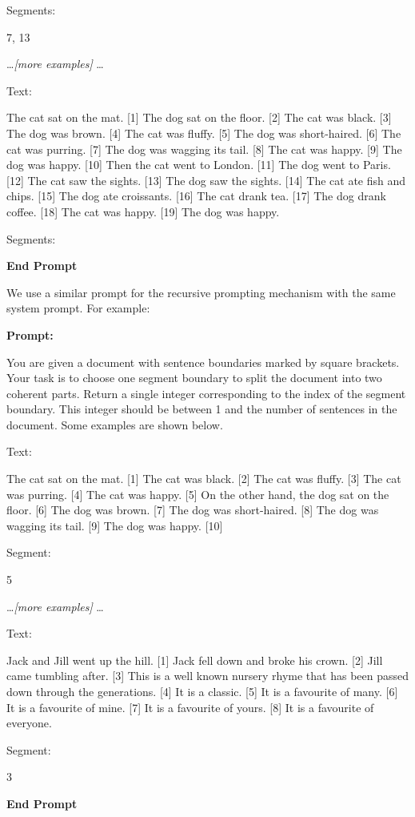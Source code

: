 Segments: 

7, 13

\ldots \emph{[more examples]} \ldots

Text: 

The cat sat on the mat. [1] The dog sat on the floor. [2] The cat was black. [3] The dog was brown. [4] The cat was fluffy. [5] The dog was short-haired. [6] The cat was purring. [7] The dog was wagging its tail. [8] The cat was happy. [9] The dog was happy. [10] Then the cat went to London. [11] The dog went to Paris. [12] The cat saw the sights. [13] The dog saw the sights. [14] The cat ate fish and chips. [15] The dog ate croissants. [16] The cat drank tea. [17] The dog drank coffee. [18] The cat was happy. [19] The dog was happy.

Segments:

\textbf{End Prompt}

We use a similar prompt for the recursive prompting mechanism with the same system prompt. For example:

\textbf{Prompt:}

You are given a document with sentence boundaries marked by square brackets. Your task is to choose one segment boundary to split the document into two coherent parts. Return a single integer corresponding to the index of the segment boundary. This integer should be between 1 and the number of sentences in the document. Some examples are shown below.

Text:

The cat sat on the mat. [1] The cat was black. [2] The cat was fluffy. [3] The cat was purring. [4] The cat was happy. [5] On the other hand, the dog sat on the floor. [6] The dog was brown. [7] The dog was short-haired. [8] The dog was wagging its tail. [9] The dog was happy. [10]

Segment:

5

\ldots \emph{[more examples]} \ldots

Text: 

Jack and Jill went up the hill. [1] Jack fell down and broke his crown. [2] Jill came tumbling after. [3] This is a well known nursery rhyme that has been passed down through the generations. [4] It is a classic. [5] It is a favourite of many. [6] It is a favourite of mine. [7] It is a favourite of yours. [8] It is a favourite of everyone.

Segment:

3

\textbf{End Prompt}

